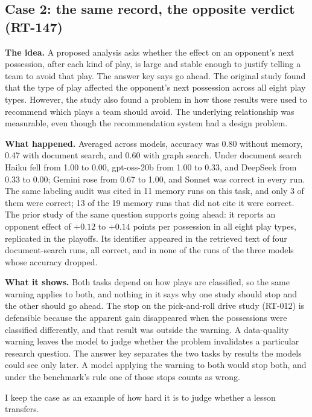 \documentclass[11pt]{article}
\begin{document}
\subsection{Case 2: the same record, the opposite verdict (RT-147)}
\label{sec:rt147}

\textbf{The idea.} A proposed analysis asks whether the effect on an opponent's next possession, after each kind of play, is large and stable enough to justify telling a team to avoid that play. The answer key says go ahead. The original study found that the type of play affected the opponent's next possession across all eight play types. However, the study also found a problem in how those results were used to recommend which plays a team should avoid. The underlying relationship was measurable, even though the recommendation system had a design problem.

\textbf{What happened.} Averaged across models, accuracy was 0.80 without memory, 0.47 with document search, and 0.60 with graph search. Under document search Haiku fell from 1.00 to 0.00, gpt-oss-20b from 1.00 to 0.33, and DeepSeek from 0.33 to 0.00; Gemini rose from 0.67 to 1.00, and Sonnet was correct in every run. The same labeling audit was cited in 11 memory runs on this task, and only 3 of them were correct; 13 of the 19 memory runs that did not cite it were correct. The prior study of the same question supports going ahead: it reports an opponent effect of $+0.12$ to $+0.14$ points per possession in all eight play types, replicated in the playoffs. Its identifier appeared in the retrieved text of four document-search runs, all correct, and in none of the runs of the three models whose accuracy dropped.

\textbf{What it shows.} Both tasks depend on how plays are classified, so the same warning applies to both, and nothing in it says why one study should stop and the other should go ahead. The stop on the pick-and-roll drive study (RT-012) is defensible because the apparent gain disappeared when the possessions were classified differently, and that result was outside the warning. A data-quality warning leaves the model to judge whether the problem invalidates a particular research question. The answer key separates the two tasks by results the models could see only later. A model applying the warning to both would stop both, and under the benchmark's rule one of those stops counts as wrong.

I keep the case as an example of how hard it is to judge whether a lesson transfers.
\end{document}
